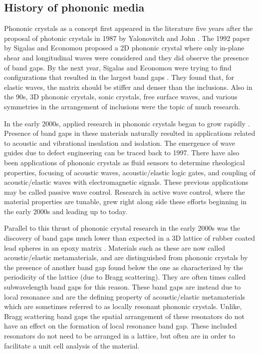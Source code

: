\documentclass{article}
\begin{document}
\subsection{History of phononic media}
Phononic crystals as a concept first appeared in the literature five years 
after the proposal of photonic crystals in 1987 by Yalonovitch and John 
\cite{hussein14}. The 1992 paper by Sigalas and Economou \cite{sigalas92} 
proposed a 2D phononic 
crystal where only in-plane shear and longitudinal waves were considered and 
they did observe the presence of band gaps. By the next year, Sigalas and 
Economou 
were trying to find configurations that resulted in the largest band gaps 
\cite{sigalas93}. They 
found that, for elastic waves, the matrix should be stiffer and denser than the 
inclusions. Also in the 90s, 3D phononic crystals, sonic crystals, free surface 
waves, and various symmetries in the arrangement of inclusions were the topic 
of much research. 

In the early 2000s, applied research in phononic crystals began to grow 
rapidly \cite{hussein14}. Presence of band gaps in these materials naturally 
resulted in 
applications related to acoustic and vibrational insulation and isolation. The 
emergence of wave guides due to defect engineering can be traced back to 1997. 
There have also been applications of phononic crystals as fluid 
sensors to determine rheological properties, focusing of acoustic waves, 
acoustic/elastic logic gates, and coupling of acoustic/elastic waves with 
electromagnetic signals. These previous applications may be called passive wave 
control. Research in active wave control, where the material properties are 
tunable, grew right along side these 
efforts beginning in the early 2000s and leading up to today.

Parallel to this thrust of phononic crystal research in the early 2000s was the 
discovery of band gaps much lower than expected in a 3D lattice of rubber 
coated lead spheres in an epoxy matrix \cite{liu00}. Materials such as these 
are now called 
acoustic/elastic metamaterials, and are distinguished from phononic crystals by 
the presence of another band gap found below the one as characterized by the 
periodicity of the lattice (due to Bragg scattering). They are often times 
called subwavelength band gaps for this reason. These band gaps are instead due 
to local resonance and are the defining property of acoustic/elastic 
metamaterials which are sometimes referred to as locally resonant phononic 
crystals. Unlike, Bragg scattering band gaps the spatial arrangement of these 
resonators do not have an effect on the formation of local resonance band gap. 
These included resonators do not need to be arranged in a lattice, but often 
are in order to facilitate a unit cell analysis of the material.
\end{document}
